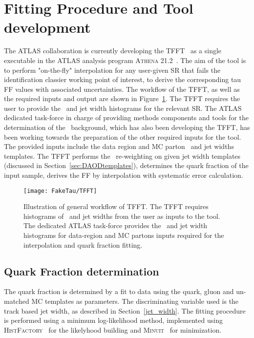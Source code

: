 	
	
	\section{Fitting Procedure and Tool development}
	The \ac{ATLAS} collaboration is currently developing the \ac{TFFT}~\cite{TFFT} as a single executable in the \ac{ATLAS} analysis program \textsc{Athena 21.2}~\cite{Calafiura:2005zz}. 
	The aim of the tool is to perform "on-the-fly" interpolation for any user-given \ac{SR} that fails the identification classier working point of interest, to derive the corresponding tau \ac{FF} values with associated uncertainties.
	The workflow of the \ac{TFFT}, as well as the required inputs and output are shown in Figure~\ref{fig:TFFT}. The \ac{TFFT} requires the user to provide the \pt\ and jet width histograms for the relevant \ac{SR}. 
	The \ac{ATLAS} dedicated task-force in charge of providing methods components and tools for the determination of the \ftau\ background, which has also been developing the \ac{TFFT}, has been working towards the preparation of the other required inputs for the tool. 
	The provided inputs include the data region and \ac{MC} parton \pt\ and jet widths templates. 
	The \ac{TFFT} performs the \pt\ re-weighting on given jet width templates (discussed in Section~\ref{sec:DAODtemplates}), determines the quark fraction of the input sample, derives the \ac{FF} by interpolation with systematic error calculation.
	\label{sec:TFFT}
	\begin{figure}[!hbt]
	\centering
	\texttt{[image: FakeTau/TFFT]}
	\caption{Illustration of general workflow of \ac{TFFT}. The \ac{TFFT} requires histograms of \pt\ and jet widths from the user as inputs to the tool. The dedicated \ac{ATLAS} task-force provides the \pt\ and jet width histograms for data-region and \ac{MC} partons inputs required for the interpolation and quark fraction fitting.}
	\label{fig:TFFT}	
	\end{figure}
	
	\subsection*{Quark Fraction determination}
	The quark fraction is determined by a fit to data using the quark, gluon and un-matched MC templates as parameters. 
	The discriminating variable used is the track based jet width, as described in Section~\ref{jet_width}. The fitting procedure is performed using a minimum log-likelihood method, implemented using \textsc{HistFactory}~\cite{Cranmer:1456844} for the likelyhood building and \textsc{Minuit}~\cite{James:2296388} for minimization.
	
